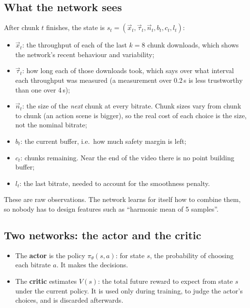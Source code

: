 \subsection{What the network sees}
After chunk $t$ finishes, the state is $s_t = (\vec{x}_t, \vec{\tau}_t, \vec{n}_t, b_t, c_t, l_t)$:
\begin{itemize}
  \item $\vec{x}_t$: the throughput of each of the last $k = 8$ chunk downloads, which shows the network's recent behaviour and variability;
  \item $\vec{\tau}_t$: how long each of those downloads took, which says over what interval each throughput was measured (a measurement over 0.2\,s is
        less trustworthy than one over 4\,s);
  \item $\vec{n}_t$: the size of the \emph{next} chunk at every bitrate. Chunk sizes vary from chunk to chunk (an action scene is bigger), so the
        real cost of each choice is the size, not the nominal bitrate;
  \item $b_t$: the current buffer, i.e.\ how much safety margin is left;
  \item $c_t$: chunks remaining. Near the end of the video there is no point building buffer;
  \item $l_t$: the last bitrate, needed to account for the smoothness penalty.
\end{itemize}
These are raw observations. The network learns for itself how to combine them, so nobody has to design features such as ``harmonic mean of 5 samples''.

\subsection{Two networks: the actor and the critic}
\begin{itemize}
  \item The \textbf{actor} is the policy $\pi_\theta(s, a)$: for state $s$, the probability of choosing each bitrate $a$. It makes the decisions.
  \item The \textbf{critic} estimates $V(s)$: the total future reward to expect from state $s$ under the current policy. It is used only during
        training, to judge the actor's choices, and is discarded afterwards.
\end{itemize}

